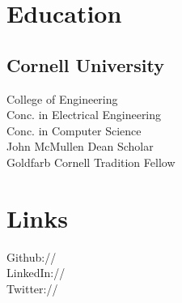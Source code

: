 \documentclass[]{deedy-resume-openfont}
\begin{document}
\lastupdated
{}

\begin{minipage}[t]{0.33\textwidth}

    \section{Education}
        \subsection{Cornell University}
            College of Engineering \\
            Conc. in Electrical Engineering \\
            Conc. in Computer Science\\
            John McMullen Dean Scholar\\
            Goldfarb Cornell Tradition Fellow\\
    \sectionsep

    \section{Links}
        Github:// \href{https://github.com/paulkiernan}{}\\
        LinkedIn:// \href{https://www.linkedin.com/pub/paul-kiernan/24/a32/470}{}\\
        Twitter:// \href{https://twitter.com/gaelic}{}\\
    \sectionsep


\end{minipage}
\end{document}
